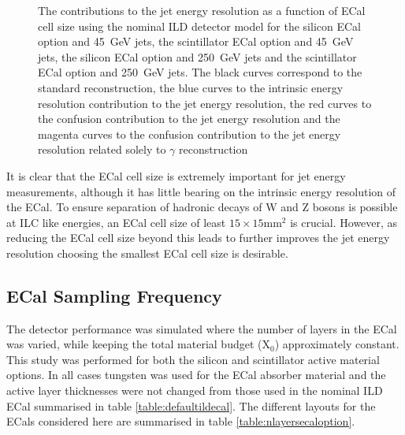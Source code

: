 \begin{figure}[h!]
\caption[The contributions to the jet energy resolution as a function of ECal cell size using the nominal ILD detector model for \protect{} the silicon ECal option and 45~GeV jets, \protect{} the scintillator ECal option and 45~GeV jets, \protect{} the silicon ECal option and 250~GeV jets and \protect{} the scintillator ECal option and 250~GeV jets.  The black curves correspond to the standard reconstruction, the blue curves to the intrinsic energy resolution contribution to the jet energy resolution, the red curves to the confusion contribution to the jet energy resolution and the magenta curves to the confusion contribution to the jet energy resolution related solely to $\gamma$ reconstruction.]{The contributions to the jet energy resolution as a function of ECal cell size using the nominal ILD detector model for \protect{} the silicon ECal option and 45~GeV jets, \protect{} the scintillator ECal option and 45~GeV jets, \protect{} the silicon ECal option and 250~GeV jets and \protect{} the scintillator ECal option and 250~GeV jets.  The black curves correspond to the standard reconstruction, the blue curves to the intrinsic energy resolution contribution to the jet energy resolution, the red curves to the confusion contribution to the jet energy resolution and the magenta curves to the confusion contribution to the jet energy resolution related solely to $\gamma$ reconstruction}
\label{fig:ecalcellsizebreak}
\end{figure}

It is clear that the ECal cell size is extremely important for jet energy measurements, although it has little bearing on the intrinsic energy resolution of the ECal.  To ensure separation of hadronic decays of W and Z bosons is possible at ILC like energies, an ECal cell size of least $15 \times 15 \text{mm}^{2}$ is crucial.  However, as reducing the ECal cell size beyond this leads to further improves the jet energy resolution choosing the smallest ECal cell size is desirable.


\subsection{ECal Sampling Frequency} 
\label{sec:ecalnlayers}
The detector performance was simulated where the number of layers in the ECal was varied, while keeping the total material budget ($\text{X}_{0}$) approximately constant.  This study was performed for both the silicon and scintillator active material options.  In all cases tungsten was used for the ECal absorber material and the active layer thicknesses were not changed from those used in the nominal ILD ECal summarised in table \ref{table:defaultildecal}.  The different layouts for the ECals considered here are summarised in table \ref{table:nlayersecaloption}.  

